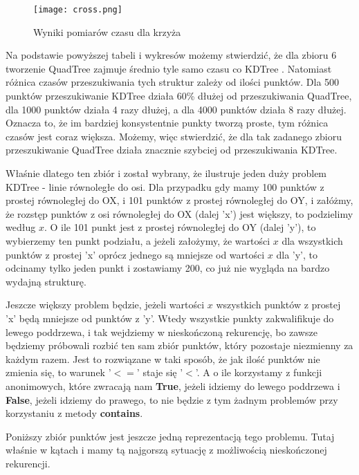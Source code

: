 \documentclass[a4paper, 12pt]{article}
\begin{document}
      \begin{figure}[h!]
      \centering
        \texttt{[image: cross.png]}
        \caption{Wyniki pomiarów czasu dla krzyża}
      \end{figure}

      \noindent
      \quad Na podstawie powyższej tabeli i wykresów możemy stwierdzić, że dla zbioru 6 tworzenie QuadTree zajmuje średnio tyle samo czasu co KDTree . Natomiast różnica czasów przeszukiwania tych struktur zależy od ilości punktów. Dla 500 punktów przeszukiwanie KDTree działa 60\% dłużej od przeszukiwania QuadTree, dla 1000 punktów działa 4 razy dłużej, a dla 4000 punktów działa 8 razy dłużej. Oznacza to, że im bardziej konsystentnie punkty tworzą proste, tym różnica czasów jest coraz większa. Możemy, więc stwierdzić, że dla tak zadanego zbioru przeszukiwanie QuadTree działa znacznie szybciej od przeszukiwania KDTree. 

      \noindent
      \quad Właśnie dlatego ten zbiór i został wybrany, że ilustruje jeden duży problem KDTree - linie równoległe do osi. Dla przypadku gdy mamy 100 punktów z prostej równoległej do OX, i 101 punktów z prostej równoległej do OY, i załóżmy, że rozstęp punktów z osi równoległej do OX (dalej 'x') jest większy, to podzielimy według $x$. O ile 101 punkt jest z prostej równoległej do OY (dalej 'y'), to wybierzemy ten punkt podziału, a jeżeli założymy, że wartości $x$ dla wszystkich punktów z prostej 'x' oprócz jednego są mniejsze od wartości $x$ dla 'y', to odcinamy tylko jeden punkt i zostawiamy 200, co już nie wygląda na bardzo wydajną strukturę. 

      \noindent
      \quad Jeszcze większy problem będzie, jeżeli wartości $x$ wszystkich punktów z prostej 'x' będą mniejsze od punktów z 'y'. Wtedy wszystkie punkty zakwalifikuje do lewego poddrzewa, i tak wejdziemy w nieskończoną rekurencję, bo zawsze będziemy próbowali rozbić ten sam zbiór punktów, który pozostaje niezmienny za każdym razem. Jest to rozwiązane w taki sposób, że jak ilość punktów nie zmienia się, to warunek '$<=$' staje się '$<$'. A o ile korzystamy z funkcji anonimowych, które zwracają nam \textbf{True}, jeżeli idziemy do lewego poddrzewa i \textbf{False}, jeżeli idziemy do prawego, to nie będzie z tym żadnym problemów przy korzystaniu z metody \textbf{contains}.

      \noindent
      \quad Poniższy zbiór punktów jest jeszcze jedną reprezentacją tego problemu. Tutaj właśnie w kątach i mamy tą najgorszą sytuację z możliwością nieskończonej rekurencji.
\end{document}
